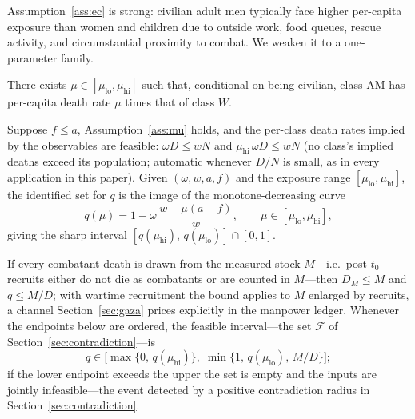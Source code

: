 Assumption~\ref{ass:ec} is strong: civilian adult men typically face higher per-capita exposure than women and children due to outside work, food queues, rescue activity, and circumstantial proximity to combat. We weaken it to a one-parameter family.

\begin{assumption}\label{ass:mu}
There exists $\mu\in[\mu_{\mathrm{lo}},\mu_{\mathrm{hi}}]$ such that, conditional on being civilian, class $\mathrm{AM}$ has per-capita death rate $\mu$ times that of class $W$.
\end{assumption}

\begin{theorem}\label{thm:bounds}
Suppose $f\le a$, Assumption~\ref{ass:mu} holds, and the per-class death rates implied by the observables are feasible: $\omega D\le wN$ and $\mu_{\mathrm{hi}}\,\omega D\le wN$ (no class's implied deaths exceed its population; automatic whenever $D/N$ is small, as in every application in this paper). Given $(\omega,w,a,f)$ and the exposure range $[\mu_{\mathrm{lo}},\mu_{\mathrm{hi}}]$, the identified set for $q$ is the image of the monotone-decreasing curve
\begin{equation}\label{eq:qmu}
q(\mu) = 1 - \omega\,\frac{w+\mu(a-f)}{w}, \qquad \mu\in[\mu_{\mathrm{lo}},\mu_{\mathrm{hi}}],
\end{equation}
giving the sharp interval $[q(\mu_{\mathrm{hi}}),\,q(\mu_{\mathrm{lo}})]\cap[0,1]$.
\end{theorem}

\begin{corollary}\label{cor:popbudget}
If every combatant death is drawn from the measured stock $M$---i.e.\ post-$t_0$ recruits either do not die as combatants or are counted in $M$---then $D_M\le M$ and $q\le M/D$; with wartime recruitment the bound applies to $M$ enlarged by recruits, a channel Section~\ref{sec:gaza} prices explicitly in the manpower ledger. Whenever the endpoints below are ordered, the feasible interval---the set $\mathcal F$ of Section~\ref{sec:contradiction}---is
\[
q \in \bigl[\max\{0,\,q(\mu_{\mathrm{hi}})\},\; \min\{1,\,q(\mu_{\mathrm{lo}}),\,M/D\}\bigr];
\]
if the lower endpoint exceeds the upper the set is empty and the inputs are jointly infeasible---the event detected by a positive contradiction radius in Section~\ref{sec:contradiction}.
\end{corollary}


